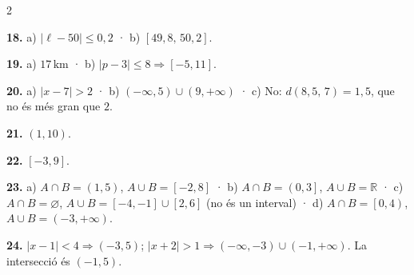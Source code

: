 \documentclass[13pt,a4paper]{extarticle}
\begin{document}
\begin{multicols}{2}
\begin{minipage}{\linewidth}
\textbf{18.} a) $|\ell-50|\le0{,}2$ · b) $\left[49{,}8,\,50{,}2\right]$.\par
\end{minipage}\par\vspace{1.6mm}
\par\noindent\begin{minipage}{\linewidth}
\textbf{19.} a) $17\,\text{km}$ · b) $|p-3|\leq8 \Rightarrow \left[-5,11\right]$.\par
\end{minipage}\par\vspace{1.6mm}
\par\noindent\begin{minipage}{\linewidth}
\textbf{20.} a) $|x-7|>2$ · b) $\left(-\infty,5\right)\cup\left(9,+\infty\right)$ · c) No: $d\left(8{,}5,\,7\right)=1{,}5$, que no és més gran que $2$.\par
\end{minipage}\par\vspace{1.6mm}
\par\noindent\begin{minipage}{\linewidth}
\textbf{21.} $\left(1,10\right)$.\par
\end{minipage}\par\vspace{1.6mm}
\par\noindent\begin{minipage}{\linewidth}
\textbf{22.} $\left[-3,9\right]$.\par
\end{minipage}\par\vspace{1.6mm}
\par\noindent\begin{minipage}{\linewidth}
\textbf{23.} a) $A\cap B=\left(1,5\right)$, $A\cup B=\left[-2,8\right]$ · b) $A\cap B=\left(0,3\right]$, $A\cup B=\mathbb{R}$ · c) $A\cap B=\varnothing$, $A\cup B=\left[-4,-1\right]\cup\left[2,6\right]$ (no és un interval) · d) $A\cap B=\left[0,4\right)$, $A\cup B=\left(-3,+\infty\right)$.\par
\end{minipage}\par\vspace{1.6mm}
\par\noindent\begin{minipage}{\linewidth}
\textbf{24.} $|x-1|<4 \Rightarrow \left(-3,5\right)$; $|x+2|>1 \Rightarrow \left(-\infty,-3\right)\cup\left(-1,+\infty\right)$. La intersecció és $\left(-1,5\right)$.\par


\end{minipage}
\end{multicols}
\end{document}
